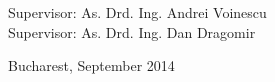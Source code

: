 \vfill\vfill\vfill
\begin{center}
	\Large
	Supervisor: As. Drd. Ing. Andrei Voinescu\\
	Supervisor: As. Drd. Ing. Dan Dragomir\\
\end{center}

\vfill
\begin{center}
	\large
	Bucharest, September 2014
\end{center}

\cleardoublepage


\pagestyle{headings}
\tableofcontents

